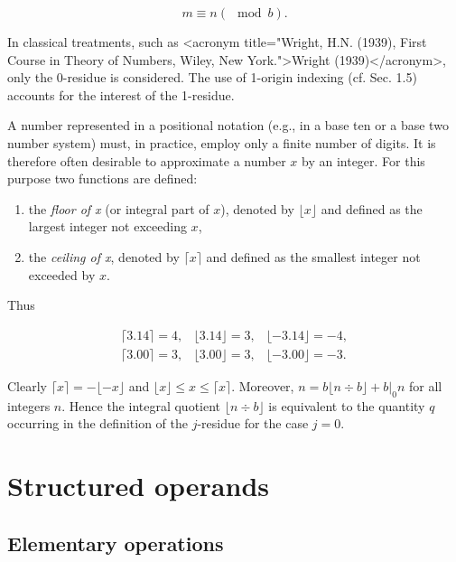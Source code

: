 $$
  m \equiv n (\mod b).
$$

\par In classical treatments, such as <acronym title="Wright, H.N. (1939), First Course in Theory of Numbers, Wiley, New York.">Wright (1939)</acronym>, only the 0-residue is considered. The use of 1-origin indexing (cf. Sec. 1.5) accounts for the interest of the 1-residue.

\par A number represented in a positional notation (e.g., in a base ten or a base two number system) must, in practice, employ only a finite number of digits. It is therefore often desirable to approximate a number $x$ by an integer. For this purpose two functions are defined:

\begin{enumerate}
  \item the \textit{floor of x} (or integral part of $x$), denoted by $⌊x⌋$ and defined as the largest integer not exceeding $x$,
  \item the \textit{ceiling of x}, denoted by $⌈x⌉$ and defined as the smallest integer not exceeded by $x$.
\end{enumerate}

\noindent Thus

\begin{align*}
  ⌈3.14⌉ = 4, & ⌊3.14⌋ = 3, & ⌊-3.14⌋ = -4, \\
  ⌈3.00⌉ = 3, & ⌊3.00⌋ = 3, & ⌊-3.00⌋ = -3.
\end{align*}

\par Clearly $⌈x⌉ = -⌊-x⌋$ and $⌊x⌋ \leq x \leq ⌈x⌉$. Moreover, $n = b⌊n ÷ b⌋ + b |_0 n$ for all integers $n$. Hence the integral quotient $⌊n ÷ b⌋$ is equivalent to the quantity $q$ occurring in the definition of the $j$-residue for the case $j = 0$.

\section{Structured operands}

\subsection*{Elementary operations}

